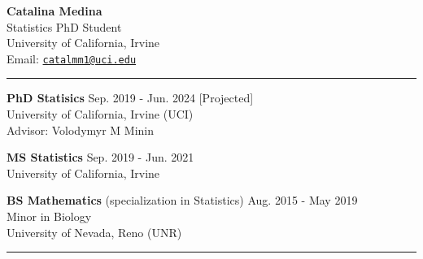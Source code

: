 \documentclass{article}
\makeatletter
\newcommand{\myname}{Catalina Medina}
\newcommand{\myemail}{catalmm1@uci.edu}
\newcommand{\myhomeaddress}{Statistics PhD Student\\ %
	 University of California, Irvine \\ 
	 Email: \texttt{\href{mailto:\myemail}{\myemail}}
 }
\makeatother
\begin{document}
\thispagestyle{empty}
\phantom{.}\vspace{-2cm}
\begin{center}
	{\huge \bf \myname}\\
	\myhomeaddress
\end{center}

\vspace{-4mm}
\rule{\linewidth}{1pt}


\begin{description}
	\vspace{-2mm}
	\item[Education]\hspace*{.1in}
	
		\textbf{PhD Statisics} \hfill{Sep. 2019 - Jun. 2024 [Projected]} \\
		University of California, Irvine (UCI)\\ 
		Advisor: Volodymyr M Minin
		\vspace*{1mm}
		
		\textbf{MS Statistics} \hfill{Sep. 2019 - Jun. 2021}\\
		University of California, Irvine
		\vspace*{1mm}
		
		\textbf{BS Mathematics} (specialization in Statistics) \hfill{Aug. 2015 - May 2019} \\
		Minor in Biology\\
		University of Nevada, Reno (UNR)
		
\end{description}
\vspace{-2mm}
\rule{\linewidth}{1pt}
\end{document}
